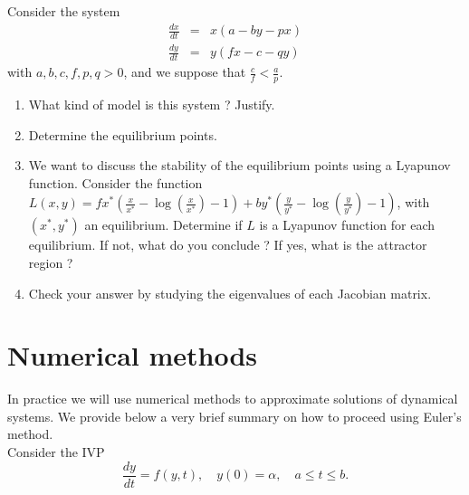 \begin{Exercise}
Consider the system
 \begin{eqnarray*}
\frac{dx}{dt} &=& x (a- b y -px)  \\
\frac{dy}{dt} &=& y(fx -c - q y)
\end{eqnarray*}
with $a,b,c,f,p,q >0$, and we suppose that $\frac{c}{f} < \frac{a}{p}$.

\begin{enumerate}
\item What kind of model is this system ? Justify.
\item Determine the equilibrium points.
\item We want to discuss the stability of the equilibrium points using a Lyapunov function. Consider the function $L(x,y) = f x^\ast (\frac{x}{x^\ast} - \log (\frac{x}{x^\ast}) -1) +by^\ast (\frac{y}{y^\ast} - \log (\frac{y}{y^\ast}) -1)  $, with $(x^\ast, y^\ast)$ an equilibrium. Determine if $L$ is a Lyapunov function for each equilibrium. If not, what do you conclude ? If yes, what is the attractor region ?
\item Check your answer by studying the eigenvalues of each Jacobian matrix.
\end{enumerate}
\dotfill

\dotfill

\dotfill

\dotfill

\dotfill

\dotfill

\dotfill

\dotfill

\dotfill

\dotfill

\dotfill

\dotfill

\dotfill

\dotfill

\dotfill

\dotfill

\dotfill

\dotfill

\dotfill

\dotfill
\end{Exercise}
\section{Numerical methods}
In practice we will use numerical methods to approximate solutions of dynamical systems. We provide below a very brief summary on how to proceed using Euler's method.\\
Consider the IVP 
 \[ \displaystyle \frac{d y}{d t} = f(y,t), \quad y(0) = \alpha, \quad a \leq t \leq b.\]
 

